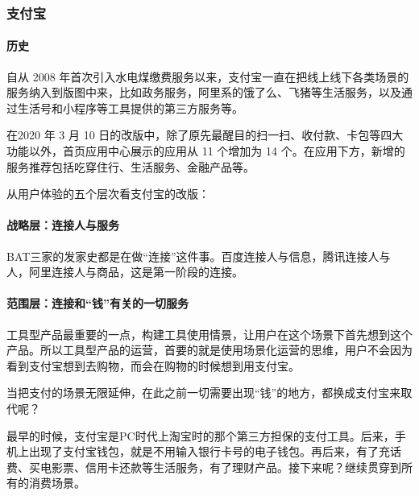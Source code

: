 \documentclass[letterpaper,11pt,english]{sphinxmanual}
\begin{document}
\subsubsection{支付宝}
\label{\detokenize{chapter_dive/alipay:id1}}\label{\detokenize{chapter_dive/alipay::doc}}

\paragraph{历史}
\label{\detokenize{chapter_dive/alipay:id2}}
自从 2008
年首次引入水电煤缴费服务以来，支付宝一直在把线上线下各类场景的服务纳入到版图中来，比如政务服务，阿里系的饿了么、飞猪等生活服务，以及通过生活号和小程序等工具提供的第三方服务等。

在2020 年 3 月 10
日的改版中，除了原先最醒目的扫一扫、收付款、卡包等四大功能以外，首页应用中心展示的应用从
11 个增加为 14
个。在应用下方，新增的服务推荐包括吃穿住行、生活服务、金融产品等。

从用户体验的五个层次看支付宝的改版：
%
\begin{footnote}[308]\sphinxAtStartFootnote
{}
%
\end{footnote}


\paragraph{战略层：连接人与服务}
\label{\detokenize{chapter_dive/alipay:id3}}
BAT三家的发家史都是在做“连接”这件事。百度连接人与信息，腾讯连接人与人，阿里连接人与商品，这是第一阶段的连接。


\paragraph{范围层：连接和“钱”有关的一切服务}
\label{\detokenize{chapter_dive/alipay:id4}}
工具型产品最重要的一点，构建工具使用情景，让用户在这个场景下首先想到这个产品。所以工具型产品的运营，首要的就是使用场景化运营的思维，用户不会因为看到支付宝想到去购物，而会在购物的时候想到用支付宝。

当把支付的场景无限延伸，在此之前一切需要出现“钱”的地方，都换成支付宝来取代呢？

最早的时候，支付宝是PC时代上淘宝时的那个第三方担保的支付工具。后来，手机上出现了支付宝钱包，就是不用输入银行卡号的电子钱包。再后来，有了充话费、买电影票、信用卡还款等生活服务，有了理财产品。接下来呢？继续贯穿到所有的消费场景。
\end{document}
